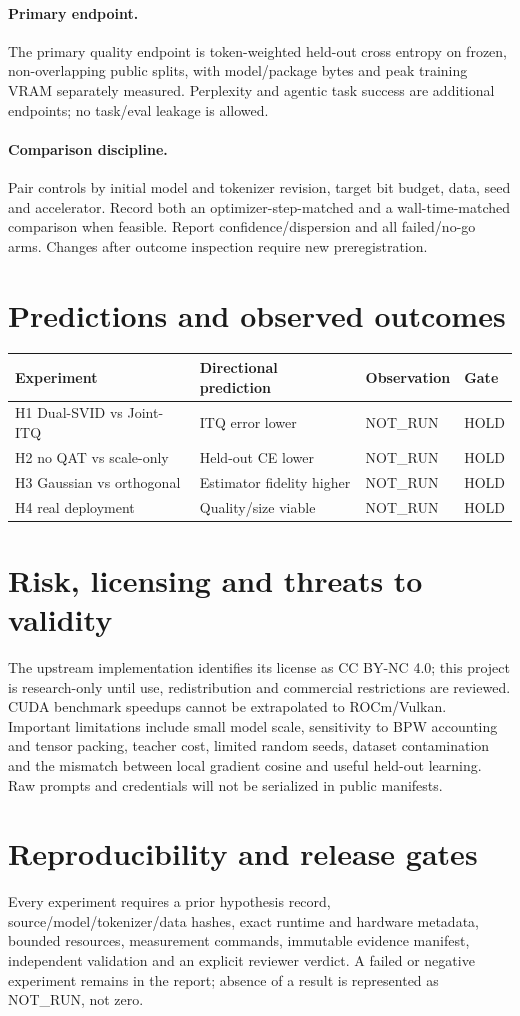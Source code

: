 \documentclass[11pt]{article}
\begin{document}
\paragraph{Primary endpoint.} The primary quality endpoint is token-weighted held-out cross entropy on frozen, non-overlapping public splits, with model/package bytes and peak training VRAM separately measured. Perplexity and agentic task success are additional endpoints; no task/eval leakage is allowed.
\paragraph{Comparison discipline.} Pair controls by initial model and tokenizer revision, target bit budget, data, seed and accelerator. Record both an optimizer-step-matched and a wall-time-matched comparison when feasible. Report confidence/dispersion and all failed/no-go arms. Changes after outcome inspection require new preregistration.
\section{Predictions and observed outcomes}
\begin{center}
\begin{tabular}{llll}
\toprule
Experiment & Directional prediction & Observation & Gate\\
\midrule
H1 Dual-SVID vs Joint-ITQ & ITQ error lower & NOT\_RUN & HOLD\\
H2 no QAT vs scale-only & Held-out CE lower & NOT\_RUN & HOLD\\
H3 Gaussian vs orthogonal & Estimator fidelity higher & NOT\_RUN & HOLD\\
H4 real deployment & Quality/size viable & NOT\_RUN & HOLD\\
\bottomrule
\end{tabular}
\end{center}
\section{Risk, licensing and threats to validity}
The upstream implementation identifies its license as CC BY-NC 4.0; this project is research-only until use, redistribution and commercial restrictions are reviewed. CUDA benchmark speedups cannot be extrapolated to ROCm/Vulkan. Important limitations include small model scale, sensitivity to BPW accounting and tensor packing, teacher cost, limited random seeds, dataset contamination and the mismatch between local gradient cosine and useful held-out learning. Raw prompts and credentials will not be serialized in public manifests.
\section{Reproducibility and release gates}
Every experiment requires a prior hypothesis record, source/model/tokenizer/data hashes, exact runtime and hardware metadata, bounded resources, measurement commands, immutable evidence manifest, independent validation and an explicit reviewer verdict. A failed or negative experiment remains in the report; absence of a result is represented as NOT\_RUN, not zero.


\end{document}
